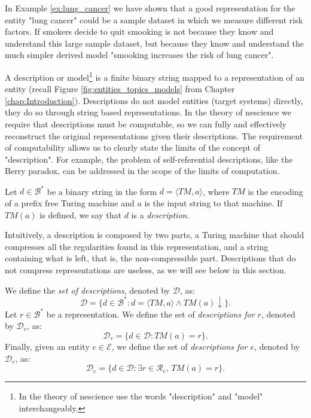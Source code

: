 \begin{example}
In Example \ref{ex:lung_cancer} we have shown that a good representation for the entity "lung cancer" could be a sample dataset in which we measure different risk factors. If smokers decide to quit smooking is not because they know and understand this large sample dataset, but because they know and understand the much simpler derived model "smooking increases the risk of lung cancer".
\end{example}

A description or model\footnote{In the theory of nescience use the words "description" and "model" interchangeably.} is a finite binary string mapped to a representation of an entity (recall Figure \ref{fig:entities_topics_models} from Chapter \ref{chap:Introduction}). Descriptions do not model entities (target systems) directly, they do so through string based representations. In the theory of nescience we require that descriptions must be computable, so we can fully and effectively reconstruct the original representations given their descriptions. The requirement of computability allows us to clearly state the limits of the concept of "description". For example, the problem of self-referential descriptions, like the Berry paradox, can be addressed in the scope of the limits of computation.

\begin{definition} [Model]
\label{def:descriptions_model}
Let $d \in \mathcal{B}^\ast$ be a binary string in the form $d = \langle TM,a \rangle$, where $TM$ is the encoding of a prefix free Turing machine and $a$ is the input string to that machine. If $TM(a)$ is defined, we say that $d$ is a \emph{description}. 
\end{definition}

Intuitively, a description is composed by two parts, a Turing machine that should compresses all the regularities found in this representation, and a string containing what is left, that is, the non-compressible part. Descriptions that do not compress representations are useless, as we will see below in this section.

\begin{definition}
\label{def:descriptions_model}
We define the \emph{set of descriptions}, denoted by $\mathcal{D}$, as:
\[
\mathcal{D} = \{ d \in \mathcal{B}^\ast : d = \langle TM,a \rangle \wedge TM(a) \downarrow \}.
\]
Let $r \in \mathcal{B}^\ast$ be a representation. We define the set of \emph{descriptions for $r$}, denoted by $\mathcal{D}_r$, as:
\[
\mathcal{D}_r = \{ d \in \mathcal{D} : TM(a) = r \}.
\]
Finally, given an entity $e \in \mathcal{E}$, we define the set of \emph{descriptions for $e$}, denoted by $\mathcal{D}_e$, as:
\[
\mathcal{D}_e = \{ d \in \mathcal{D} : \exists r \in \mathcal{R}_e,\, TM(a) = r \}.
\]
\end{definition}

